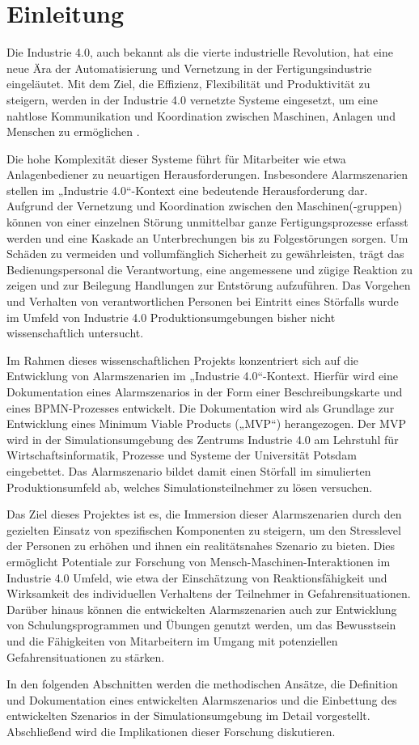 \section{Einleitung}
Die Industrie 4.0, auch bekannt als die vierte industrielle Revolution, hat eine neue Ära der Automatisierung und Vernetzung in der Fertigungsindustrie eingeläutet. Mit dem Ziel, die Effizienz, Flexibilität und Produktivität zu steigern, werden in der Industrie 4.0 vernetzte Systeme eingesetzt, um eine nahtlose Kommunikation und Koordination zwischen Maschinen, Anlagen und Menschen zu ermöglichen \autocite{reinheimer}.

Die hohe Komplexität dieser Systeme führt für Mitarbeiter wie etwa Anlagenbediener zu neuartigen Herausforderungen. Insbesondere Alarmszenarien stellen im „Industrie 4.0“-Kontext eine bedeutende Herausforderung dar. Aufgrund der Vernetzung und Koordination zwischen den Maschinen(-gruppen) können von einer einzelnen Störung unmittelbar ganze Fertigungsprozesse erfasst werden und eine Kaskade an Unterbrechungen bis zu Folgestörungen sorgen. Um Schäden zu vermeiden und vollumfänglich Sicherheit zu gewährleisten, trägt das Bedienungspersonal die Verantwortung, eine angemessene und zügige Reaktion zu zeigen und zur Beilegung Handlungen zur Entstörung aufzuführen. Das Vorgehen und Verhalten von verantwortlichen Personen bei Eintritt eines Störfalls wurde im Umfeld von Industrie 4.0 Produktionsumgebungen bisher nicht wissenschaftlich untersucht.

Im Rahmen dieses wissenschaftlichen Projekts konzentriert sich auf die Entwicklung von Alarmszenarien im „Industrie 4.0“-Kontext. Hierfür wird eine Dokumentation eines Alarmszenarios in der Form einer Beschreibungskarte und eines BPMN-Prozesses entwickelt. Die Dokumentation wird als Grundlage zur Entwicklung eines Minimum Viable Products („MVP“) herangezogen. Der MVP wird in der Simulationsumgebung des Zentrums Industrie 4.0 am Lehrstuhl für Wirtschaftsinformatik, Prozesse und Systeme der Universität Potsdam eingebettet. Das Alarmszenario bildet damit einen Störfall im simulierten Produktionsumfeld ab, welches Simulationsteilnehmer zu lösen versuchen.

Das Ziel dieses Projektes ist es, die Immersion dieser Alarmszenarien durch den gezielten Einsatz von spezifischen Komponenten zu steigern, um den Stresslevel der Personen zu erhöhen und ihnen ein realitätsnahes Szenario zu bieten. Dies ermöglicht Potentiale zur Forschung von Mensch-Maschinen-Interaktionen im Industrie 4.0 Umfeld, wie etwa der Einschätzung von Reaktionsfähigkeit und Wirksamkeit des individuellen Verhaltens der Teilnehmer in Gefahrensituationen. Darüber hinaus können die entwickelten Alarmszenarien auch zur Entwicklung von Schulungsprogrammen und Übungen genutzt werden, um das Bewusstsein und die Fähigkeiten von Mitarbeitern im Umgang mit potenziellen Gefahrensituationen zu stärken.

In den folgenden Abschnitten werden die methodischen Ansätze, die Definition und Dokumentation eines entwickelten Alarmszenarios und die Einbettung des entwickelten Szenarios in der Simulationsumgebung im Detail vorgestellt. Abschließend wird die Implikationen dieser Forschung diskutieren.
\\

\label{section:name-}
